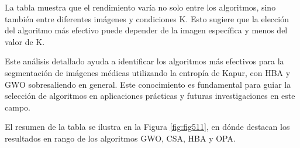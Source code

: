 \documentclass[conference]{IEEEtran}
\begin{document}
\noindent La tabla muestra que el rendimiento varía no solo entre los algoritmos, sino también entre diferentes imágenes y condiciones K. Esto sugiere que la elección del algoritmo más efectivo puede depender de la imagen específica y menos del valor de K.

\noindent Este análisis detallado ayuda a identificar los algoritmos más efectivos para la segmentación de imágenes médicas utilizando la entropía de Kapur, con HBA y GWO sobresaliendo en general. Este conocimiento es fundamental para guiar la selección de algoritmos en aplicaciones prácticas y futuras investigaciones en este campo.

\noindent El resumen de la tabla se ilustra en la Figura \ref{fig:fig511}, en dónde destacan los resultados en rango de los algoritmos GWO, CSA, HBA y OPA.
\end{document}
